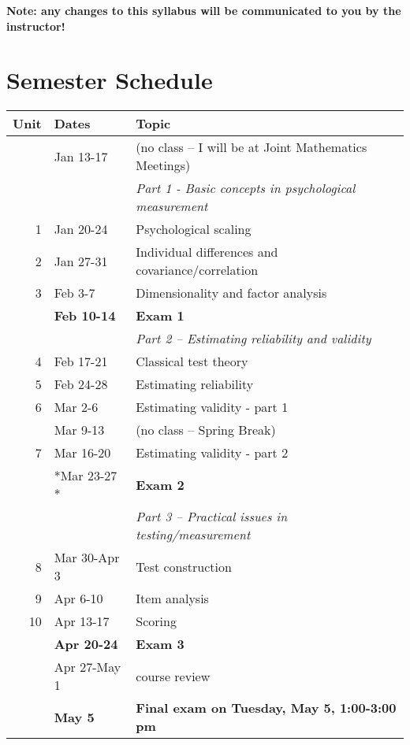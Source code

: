 \documentclass[10pt]{article}
\begin{document}
\textbf{Note:  any changes to this syllabus will be communicated to you by the instructor!}


\section*{Semester Schedule}
\label{sec:org470581e}
\begin{center}
\begin{tabular}{rll}
Unit & Dates & Topic\\
\hline
 & Jan 13-17 & (no class -- I will be at Joint Mathematics Meetings)\\
 &  & \emph{Part 1 - Basic concepts in psychological measurement}\\
1 & Jan 20-24 & Psychological scaling\\
2 & Jan 27-31 & Individual differences and covariance/correlation\\
3 & Feb 3-7 & Dimensionality and factor analysis\\
 & \textbf{Feb 10-14} & \textbf{Exam 1}\\
\hline
 &  & \emph{Part 2 -- Estimating reliability and validity}\\
4 & Feb 17-21 & Classical test theory\\
5 & Feb 24-28 & Estimating reliability\\
6 & Mar 2-6 & Estimating validity - part 1\\
 & Mar 9-13 & (no class -- Spring Break)\\
7 & Mar 16-20 & Estimating validity - part 2\\
 & *Mar 23-27 * & \textbf{Exam 2}\\
\hline
 &  & \emph{Part 3 -- Practical issues in testing/measurement}\\
8 & Mar 30-Apr 3 & Test construction\\
9 & Apr 6-10 & Item analysis\\
10 & Apr 13-17 & Scoring\\
 & \textbf{Apr 20-24} & \textbf{Exam 3}\\
 & Apr 27-May 1 & course review\\
 & \textbf{May 5} & \textbf{Final exam on Tuesday, May 5, 1:00-3:00 pm}\\
\hline
\end{tabular}
\end{center}
\end{document}
